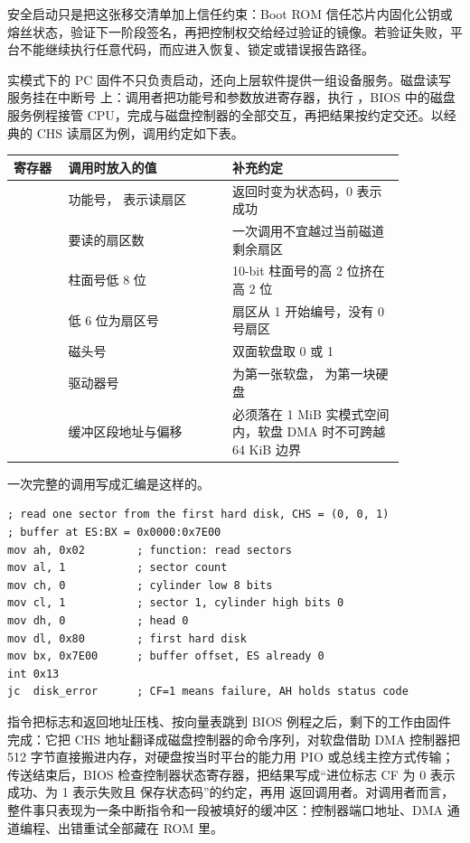 安全启动只是把这张移交清单加上信任约束：Boot ROM 信任芯片内固化公钥或熔丝状态，验证下一阶段签名，再把控制权交给经过验证的镜像。若验证失败，平台不能继续执行任意代码，而应进入恢复、锁定或错误报告路径。

实模式下的 PC 固件不只负责启动，还向上层软件提供一组设备服务。磁盘读写服务挂在中断号  上：调用者把功能号和参数放进寄存器，执行 ，BIOS 中的磁盘服务例程接管 CPU，完成与磁盘控制器的全部交互，再把结果按约定交还。以经典的 CHS 读扇区为例，调用约定如下表。

\begin{longtable}{L{0.12\linewidth}L{0.36\linewidth}L{0.38\linewidth}}
\toprule
寄存器 & 调用时放入的值 & 补充约定 \\
\midrule
{} & 功能号， 表示读扇区 & 返回时变为状态码，0 表示成功 \\
 & 要读的扇区数 & 一次调用不宜越过当前磁道剩余扇区 \\
 & 柱面号低 8 位 & 10-bit 柱面号的高 2 位挤在  高 2 位 \\
 & 低 6 位为扇区号 & 扇区从 1 开始编号，没有 0 号扇区 \\
 & 磁头号 & 双面软盘取 0 或 1 \\
 & 驱动器号 &  为第一张软盘， 为第一块硬盘 \\
 & 缓冲区段地址与偏移 & 必须落在 1 MiB 实模式空间内，软盘 DMA 时不可跨越 64 KiB 边界 \\
\bottomrule
\end{longtable}

一次完整的调用写成汇编是这样的。

\begin{lstlisting}
; read one sector from the first hard disk, CHS = (0, 0, 1)
; buffer at ES:BX = 0x0000:0x7E00
mov ah, 0x02        ; function: read sectors
mov al, 1           ; sector count
mov ch, 0           ; cylinder low 8 bits
mov cl, 1           ; sector 1, cylinder high bits 0
mov dh, 0           ; head 0
mov dl, 0x80        ; first hard disk
mov bx, 0x7E00      ; buffer offset, ES already 0
int 0x13
jc  disk_error      ; CF=1 means failure, AH holds status code
\end{lstlisting}

 指令把标志和返回地址压栈、按向量表跳到 BIOS 例程之后，剩下的工作由固件完成：它把 CHS 地址翻译成磁盘控制器的命令序列，对软盘借助 DMA 控制器把 512 字节直接搬进内存，对硬盘按当时平台的能力用 PIO 或总线主控方式传输；传送结束后，BIOS 检查控制器状态寄存器，把结果写成“进位标志 CF 为 0 表示成功、为 1 表示失败且  保存状态码”的约定，再用  返回调用者。对调用者而言，整件事只表现为一条中断指令和一段被填好的缓冲区：控制器端口地址、DMA 通道编程、出错重试全部藏在 ROM 里。

